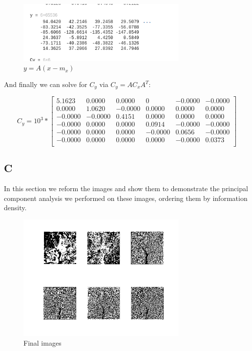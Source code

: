 \documentclass{article}
\begin{document}
\begin{figure}[H]
    \centering
    \includegraphics[width = 0.75\textwidth]{imgs/3b.png}
    \caption{$y=A(x-m_x)$}
    \label{fig:3b}
\end{figure}

\noindent And finally we can solve for $C_y$ via $C_y = A C_x A^T$:

\begin{equation}
    C_y = 10^3 *
    \begin{bmatrix}
        5.1623 &    0.0000 &    0.0000 &         0  &  -0.0000  & -0.0000 \\
        0.0000 &    1.0620 &   -0.0000 &    0.0000  &   0.0000  &  0.0000 \\
        -0.0000 &   -0.0000 &    0.4151 &    0.0000 &    0.0000 &   0.0000 \\
        -0.0000 &    0.0000 &    0.0000 &    0.0914 &   -0.0000 &  -0.0000 \\
        -0.0000 &    0.0000 &    0.0000 &   -0.0000 &    0.0656 &  -0.0000 \\
        -0.0000 &    0.0000 &    0.0000 &    0.0000 &   -0.0000 &   0.0373 \\
    \end{bmatrix}
\end{equation}

\subsection*{C}

In this section we reform the images and show them to demonstrate the principal component analysis we performed on these images, ordering them by information density.

\begin{figure}[H]
    \centering
    \includegraphics[width = 0.75\textwidth]{imgs/3c.jpg}
    \caption{Final images}
    \label{fig:3c}
\end{figure}
\end{document}
